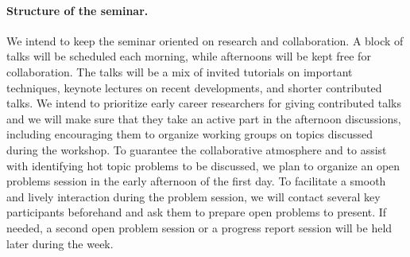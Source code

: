 \paragraph*{Structure of the seminar.}
We intend to keep the seminar oriented on research and collaboration.
A block of talks will be scheduled each morning, while afternoons will be kept free for collaboration.
The talks will be a mix of invited tutorials on important techniques,
keynote lectures on recent developments, and shorter contributed talks.
We intend to prioritize early career researchers for giving contributed talks and
we will make sure that they take an active part in the afternoon discussions,
including encouraging them to organize working groups on topics discussed during the workshop.
To guarantee the collaborative atmosphere and to assist with identifying hot topic problems to be discussed,
we plan to organize an open problems session in the early afternoon of the first day.
To facilitate a smooth and lively interaction during the problem session,
we will contact several key participants beforehand and ask them to prepare open problems to present.
If needed, a second open problem session or a progress report session will be held later during the week.
